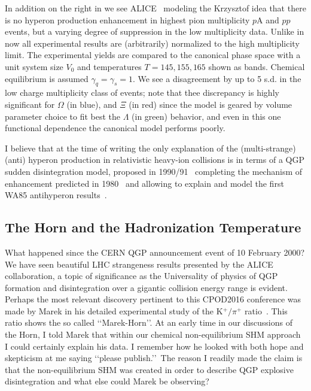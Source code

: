 \documentclass{appolb}
\begin{document}
In addition on the right in  we see ALICE~\cite{Adam:2015vsf}  modeling the  Krzysztof idea that there is no hyperon production enhancement in highest pion multiplicity  $p$A and $pp$ events, but a varying degree of suppression in the low multiplicity data. Unlike in  now all experimental results are (arbitrarily) normalized to the high multiplicity limit. The experimental yields are compared to the canonical phase space with a unit system size $V_0$  and temperatures $T=145,155,165$  shown as bands. Chemical equilibrium is assumed $\gamma_q=\gamma_s=1$.  We see a disagreement by up to 5 s.d. in the low charge multiplicity class of events; note that thee discrepancy is highly significant for $\Omega$ (in blue), and $\Xi$ (in red) since the model is geared by volume parameter choice to fit best the $\Lambda$ (in green) behavior, and even in this one functional dependence the canonical model performs poorly.

I believe that at the time of writing the only explanation of the  (multi-strange) (anti) hyperon production in relativistic heavy-ion collisions is in terms of a QGP sudden disintegration model, proposed in 1990/91~\cite{Rafelski:1991rh} completing the mechanism of enhancement predicted in 1980~\cite{Rafelski:1980fy} and allowing to explain and model the first WA85 antihyperon results~\cite{Abatzis:1991ju}.

\subsection{The Horn and the Hadronization Temperature}\label{ssec:horn}
What happened since the CERN QGP announcement event of 10 February 2000? We have seen beautiful LHC strangeness results presented by the ALICE collaboration, a topic of significance as the Universality of physics of QGP formation and disintegration over a gigantic collision energy range is evident. Perhaps the most relevant discovery pertinent to this CPOD2016 conference was made by Marek in his detailed experimental study of the K$^+/\pi^+$ ratio~\cite{Gazdzicki:2010iv}. This ratio shows the so called \lq\lq Marek-Horn\rq\rq. At an early time in our discussions of the Horn, I told Marek that within our chemical non-equilibrium SHM approach I could certainly explain his data. I remember how he looked with both hope and skepticism at me saying \lq\lq please publish.\rq\rq\ The reason I readily made the claim is that the non-equilibrium SHM was created in order to describe QGP explosive disintegration and what else could Marek be observing?
\end{document}

